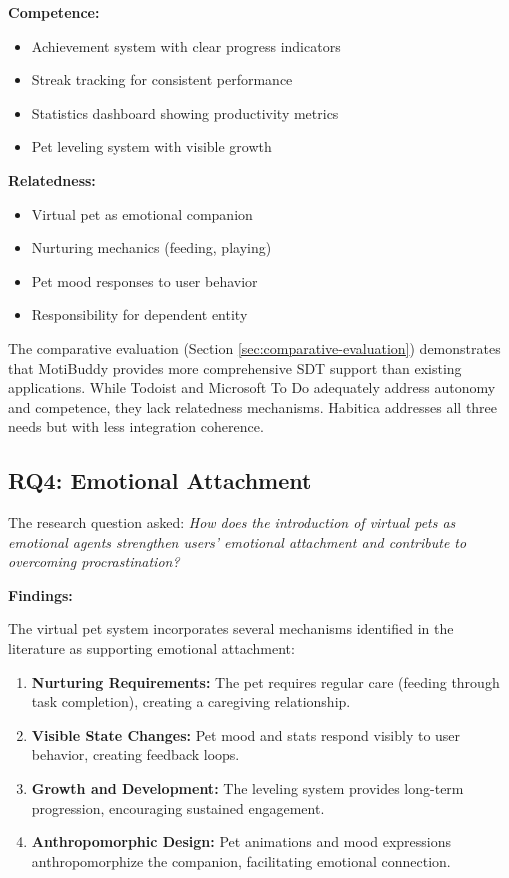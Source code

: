 \textbf{Competence:}
\begin{itemize}
    \item Achievement system with clear progress indicators
    \item Streak tracking for consistent performance
    \item Statistics dashboard showing productivity metrics
    \item Pet leveling system with visible growth
\end{itemize}

\textbf{Relatedness:}
\begin{itemize}
    \item Virtual pet as emotional companion
    \item Nurturing mechanics (feeding, playing)
    \item Pet mood responses to user behavior
    \item Responsibility for dependent entity
\end{itemize}

The comparative evaluation (Section \ref{sec:comparative-evaluation}) demonstrates that MotiBuddy provides more comprehensive SDT support than existing applications. While Todoist and Microsoft To Do adequately address autonomy and competence, they lack relatedness mechanisms. Habitica addresses all three needs but with less integration coherence.

\subsection{RQ4: Emotional Attachment}

The research question asked: \textit{How does the introduction of virtual pets as emotional agents strengthen users' emotional attachment and contribute to overcoming procrastination?}

\textbf{Findings:}

The virtual pet system incorporates several mechanisms identified in the literature as supporting emotional attachment:

\begin{enumerate}
    \item \textbf{Nurturing Requirements:} The pet requires regular care (feeding through task completion), creating a caregiving relationship.
    
    \item \textbf{Visible State Changes:} Pet mood and stats respond visibly to user behavior, creating feedback loops.
    
    \item \textbf{Growth and Development:} The leveling system provides long-term progression, encouraging sustained engagement.
    
    \item \textbf{Anthropomorphic Design:} Pet animations and mood expressions anthropomorphize the companion, facilitating emotional connection.
\end{enumerate}

